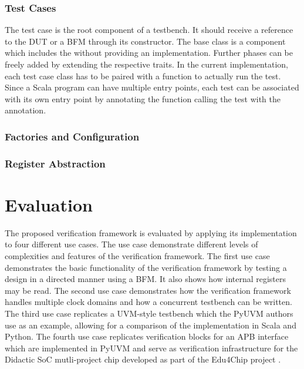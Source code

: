 \subsection{Test Cases} %

The test case is the root component of a testbench. It should receive a reference to the DUT or a BFM through its
constructor. The  base class is a component which includes the  without providing an implementation. Further phases can be freely added by extending the respective traits. In the current implementation, each test case class has to be paired with a  function to actually run the test. Since a Scala program can have multiple entry points, each test can be associated with its own entry point by annotating the function calling the test with the  annotation.

\subsection{Factories and Configuration} %

\subsection{Register Abstraction} %









\chapter{Evaluation} %

The proposed verification framework is evaluated by applying its implementation to four different use cases. The use case demonstrate different levels of complexities and features of the verification framework. The first use case demonstrates the basic functionality of the verification framework by testing a design in a directed manner using a BFM. It also shows how internal registers may be read. The second use case demonstrates how the verification framework handles multiple clock domains and how a concurrent testbench can be written. The third use case replicates a UVM-style testbench which the PyUVM authors use as an example, allowing for a comparison of the implementation in Scala and Python. The fourth use case replicates verification blocks for an APB interface which are implemented in PyUVM and serve as verification infrastructure for the Didactic SoC mutli-project chip developed as part of the Edu4Chip project \cite{edu4chip}.

